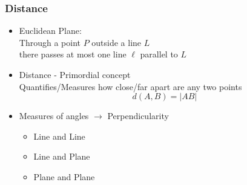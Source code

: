 \begin{frame}
 \frametitle{Distance}

\begin{itemize}
 \item Euclidean Plane: \\
    Through a point $P$ outside a line $L$\\ there passes at most one line $\ell$ parallel to $L$
  \item<2-> Distance - Primordial concept \\
      Quantifies/Measures how close/far apart are any two points \\
      $$d(A,B) = |AB|$$
  \item<3-> Measures of angles $\to$ Perpendicularity
      \begin{itemize}
	\item Line and Line
        \item Line and Plane
        \item Plane and Plane
      \end{itemize}
  \end{itemize}

\end{frame}